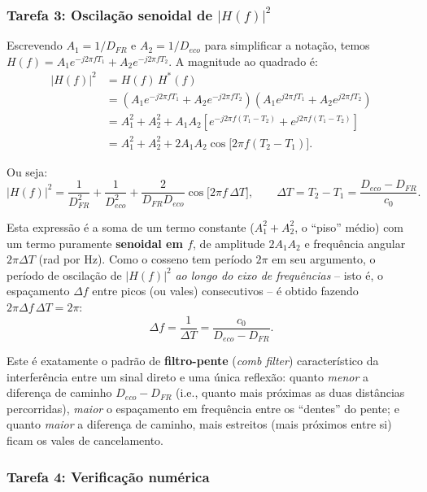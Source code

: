 \documentclass[a4paper,twoside,12pt]{article}
\begin{document}
	\subsubsection*{Tarefa 3: Oscilação senoidal de $|H(f)|^2$}
	
	Escrevendo $A_1 = 1/D_{FR}$ e $A_2 = 1/D_{eco}$ para simplificar a notação, temos $H(f) = A_1 e^{-j2\pi f T_1} + A_2 e^{-j2\pi f T_2}$. A magnitude ao quadrado é:
	\begin{align}
		|H(f)|^2 &= H(f)\, H^*(f) \nonumber \\
		&= \left(A_1 e^{-j2\pi f T_1} + A_2 e^{-j2\pi f T_2}\right)\left(A_1 e^{j2\pi f T_1} + A_2 e^{j2\pi f T_2}\right) \nonumber \\
		&= A_1^2 + A_2^2 + A_1 A_2 \left[e^{-j2\pi f(T_1-T_2)} + e^{j2\pi f(T_1-T_2)}\right] \nonumber \\
		&= A_1^2 + A_2^2 + 2 A_1 A_2 \cos\!\big[2\pi f (T_2-T_1)\big].
	\end{align}
	
	Ou seja:
	\begin{equation}
		\boxed{|H(f)|^2 = \frac{1}{D_{FR}^2} + \frac{1}{D_{eco}^2} + \frac{2}{D_{FR}D_{eco}} \cos\!\big[2\pi f \, \Delta T\big]}, \qquad \Delta T = T_2 - T_1 = \frac{D_{eco}-D_{FR}}{c_0}.
	\end{equation}
	
	Esta expressão é a soma de um termo constante ($A_1^2+A_2^2$, o ``piso'' médio) com um termo puramente \textbf{senoidal em $f$}, de amplitude $2A_1A_2$ e frequência angular $2\pi \Delta T$ (rad por Hz). Como o cosseno tem período $2\pi$ em seu argumento, o período de oscilação de $|H(f)|^2$ \emph{ao longo do eixo de frequências} -- isto é, o espaçamento $\Delta f$ entre picos (ou vales) consecutivos -- é obtido fazendo $2\pi \Delta f \, \Delta T = 2\pi$:
	\begin{equation}
		\boxed{\Delta f = \frac{1}{\Delta T} = \frac{c_0}{D_{eco}-D_{FR}}}.
	\end{equation}
	
	Este é exatamente o padrão de \textbf{filtro-pente} (\emph{comb filter}) característico da interferência entre um sinal direto e uma única reflexão: quanto \emph{menor} a diferença de caminho $D_{eco}-D_{FR}$ (i.e., quanto mais próximas as duas distâncias percorridas), \emph{maior} o espaçamento em frequência entre os ``dentes'' do pente; e quanto \emph{maior} a diferença de caminho, mais estreitos (mais próximos entre si) ficam os vales de cancelamento.
	
	\subsubsection*{Tarefa 4: Verificação numérica}
	
\end{document}
